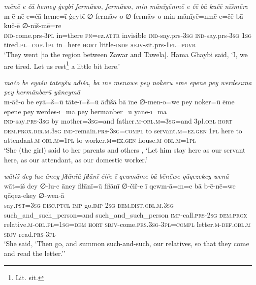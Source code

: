 \ea \label{BP.181}
\textit{mēnē e čā ħemey ġeybī fermāwo, fermāwo, min mānīyēnmē e čē bā kučē nīšmēre} \\ 
\gll m-ē-nē e=čā ħeme=ī ġeybī ∅-fermāw-o ∅-fermāw-o min mānīyē=nmē e=čē bā kuč-ē ∅-nīš-mē=re \\ 
 \textsc{ind-}come.prs\textsc{-3pl} in=there \textsc{pn}=ez.\textsc{attr} invisible \textsc{ind-}say.prs\textsc{-3sg} \textsc{ind-}say.prs\textsc{-3sg} \textsc{1sg} tired\textsc{.pl}\textsc{=cop}\textsc{.\textsc{1pl}} in=here \textsc{hort} little\textsc{-indf} \textsc{sbjv-}sit.prs\textsc{-\textsc{1pl}}\textsc{=\textsc{povb}} \\ 
\glt `They went [to the region between Zawar and Tawela]. Hama Ghaybi said, ‘I, we are tired. Let us rest\footnote{Lit. sit.} a little bit here.'
\z 
 
\ea \label{KŠ.43}
\textit{māčo be eyāšū tāteyšū āđīšā, bā īne menowe pey nokerū ēme epēne pey werdesīmā pey hermānberū yāneymā} \\ 
\gll m-āč-o be eyā=š=ū tāte-ī=š=ū āđīšā bā īne ∅-men-o=we pey noker=ū ēme epēne pey werdes-ī=mā pey hermānber=ū yāne-ī=mā \\ 
 \textsc{ind-}say\textsc{.prs}\textsc{-3sg} by mother\textsc{=3sg}=and father\textsc{.m}\textsc{-obl}\textsc{.m}\textsc{=3sg}=and 3pl\textsc{.obl} \textsc{hort} \textsc{dem.prox}\textsc{.dir}\textsc{.m}\textsc{.3sg} \textsc{ind-}remain\textsc{.prs}\textsc{-3sg}\textsc{=compl} to servant\textsc{.m}\textsc{=ez.gen} \textsc{1pl} here to attendant\textsc{.m}\textsc{-obl}\textsc{.m}\textsc{=\textsc{1pl}} to worker\textsc{.m}\textsc{=ez.gen} house\textsc{.m}\textsc{-obl}\textsc{.m}\textsc{=\textsc{1pl}} \\ 
\glt `She (the girl) said to her parents and others , ‘Let him stay here as our servant here, as our attendant, as our domestic worker.'
\z 
 
\ea \label{KŠ.86}
\textit{wātiš dey lue āney fiɫānīū fiɫānī čiře ī qewmāme bā bēnēwe qāqezekey wenā} \\ 
\gll wāt=iš dey ∅-lu-e āney fiɫānī=ū fiɫānī ∅-čiř-e ī qewm-ā=m=e bā b-ē-nē=we qāqez-ekey ∅-wen-ā \\ 
 say\textsc{.pst}\textsc{=3sg} \textsc{disc.ptcl} \textsc{imp-}go.\textsc{imp-}\textsc{2sg} \textsc{dem.dist}\textsc{.obl}\textsc{.m}\textsc{.3sg} such\_and\_such\_person=and such\_and\_such\_person \textsc{imp-}call\textsc{.prs}-\textsc{2sg} \textsc{dem.prox} relative\textsc{.m}\textsc{-obl}\textsc{.pl}\textsc{=\textsc{1sg}}\textsc{=dem} \textsc{hort} \textsc{sbjv-}come\textsc{.prs}\textsc{.3sg}\textsc{-3pl}\textsc{=compl} letter\textsc{.m}\textsc{-def}\textsc{.obl}\textsc{.m} \textsc{sbjv-}read\textsc{.prs}\textsc{-3pl} \\ 
\glt `She said, ‘Then go, and summon such-and-such, our relatives, so that they come and read the letter.’'
\z 
 
